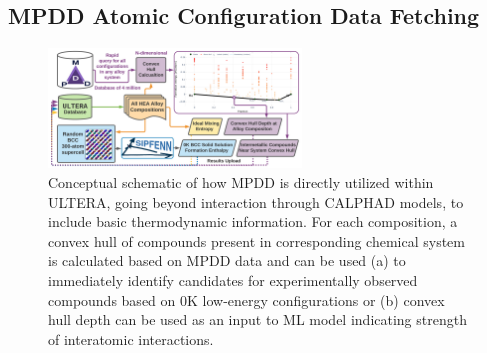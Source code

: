 \subsection{MPDD Atomic Configuration Data Fetching} \label{ultera:ssec:mpdd}

\todo

\begin{figure}[H]
    \centering
    \includegraphics[width=0.6\textwidth]{ultera/ULTERA_BasicThermodynamics_V1.png}
    \caption{Conceptual schematic of how MPDD is directly utilized within ULTERA, going beyond interaction through CALPHAD models, to include basic thermodynamic information. For each composition, a convex hull of compounds present in corresponding chemical system is calculated based on MPDD data and can be used (a) to immediately identify candidates for experimentally observed compounds based on 0K low-energy configurations or (b) convex hull depth can be used as an input to ML model indicating strength of interatomic interactions.}
    \label{ultera:fig:mpdd}
\end{figure}








\printbibliography[heading=subbibintoc]